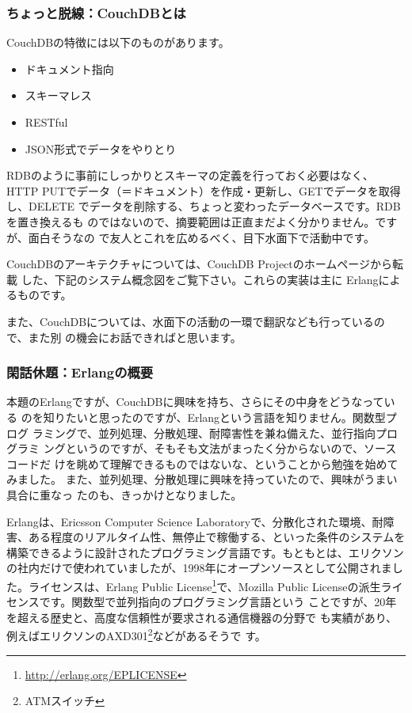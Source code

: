 \documentclass[mingoth,a4paper]{jsarticle}
\begin{document}
\subsubsection{ちょっと脱線：CouchDBとは}
CouchDBの特徴には以下のものがあります。
\begin{itemize}
 \item ドキュメント指向
 \item スキーマレス
 \item RESTful
 \item JSON形式でデータをやりとり
\end{itemize}

RDBのように事前にしっかりとスキーマの定義を行っておく必要はなく、HTTP
PUTでデータ（＝ドキュメント）を作成・更新し、GETでデータを取得し、DELETE
でデータを削除する、ちょっと変わったデータベースです。RDBを置き換えるも
のではないので、摘要範囲は正直まだよく分かりません。ですが、面白そうなの
で友人とこれを広めるべく、目下水面下で活動中です。

CouchDBのアーキテクチャについては、CouchDB Projectのホームページから転載
した、下記のシステム概念図をご覧下さい。これらの実装は主に Erlangによるものです。

また、CouchDBについては、水面下の活動の一環で翻訳なども行っているので、また別
の機会にお話できればと思います。


\subsubsection{閑話休題：Erlangの概要}
本題のErlangですが、CouchDBに興味を持ち、さらにその中身をどうなっている
のを知りたいと思ったのですが、Erlangという言語を知りません。関数型プログ
ラミングで、並列処理、分散処理、耐障害性を兼ね備えた、並行指向プログラミ
ングというのですが、そもそも文法がまったく分からないので、ソースコードだ
けを眺めて理解できるものではないな、ということから勉強を始めてみました。
また、並列処理、分散処理に興味を持っていたので、興味がうまい具合に重なっ
たのも、きっかけとなりました。

Erlangは、Ericsson Computer Science Laboratoryで、分散化された環境、耐障
害、ある程度のリアルタイム性、無停止で稼働する、といった条件のシステムを
構築できるように設計されたプログラミング言語です。もともとは、エリクソン
の社内だけで使われていましたが、1998年にオープンソースとして公開されまし
た。ライセンスは、Erlang Public
License\footnote{\url{http://erlang.org/EPLICENSE}}で、Mozilla Public
Licenseの派生ライセンスです。関数型で並列指向のプログラミング言語という
ことですが、20年を超える歴史と、高度な信頼性が要求される通信機器の分野で
も実績があり、例えばエリクソンのAXD301\footnote{ATMスイッチ}などがあるそうで
す。
\end{document}
